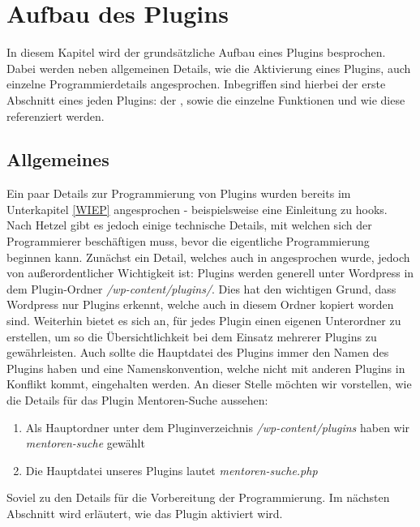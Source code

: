 \section{Aufbau des Plugins}\label{AUFBAUPLUGIN}
In diesem Kapitel wird der grundsätzliche Aufbau eines Plugins besprochen. Dabei werden neben allgemeinen Details, wie die Aktivierung eines Plugins, auch einzelne Programmierdetails angesprochen. Inbegriffen sind hierbei der erste Abschnitt eines jeden Plugins: der , sowie die einzelne Funktionen und wie diese referenziert werden.
\subsection{Allgemeines}
Ein paar Details zur Programmierung von Plugins wurden bereits im Unterkapitel \ref{WIEP} angesprochen - beispielsweise eine Einleitung zu hooks.\newline
Nach Hetzel gibt es jedoch einige technische Details, mit welchen sich der Programmierer beschäftigen muss, bevor die eigentliche Programmierung beginnen kann. Zunächst ein Detail, welches auch in  angesprochen wurde, jedoch von außerordentlicher Wichtigkeit ist: Plugins werden generell unter Wordpress in dem Plugin-Ordner {\emph{/wp-content/plugins/}}. Dies hat den wichtigen Grund, dass Wordpress nur Plugins erkennt, welche auch in diesem Ordner kopiert worden sind. Weiterhin bietet es sich an, für jedes Plugin einen eigenen Unterordner zu erstellen, um so die Übersichtlichkeit bei dem Einsatz mehrerer Plugins zu gewährleisten. Auch sollte die Hauptdatei des Plugins immer den Namen des Plugins haben und eine Namenskonvention, welche nicht mit anderen Plugins in Konflikt kommt, eingehalten werden.\newline
An dieser Stelle möchten wir vorstellen, wie die Details für das Plugin Mentoren-Suche aussehen:
\begin{enumerate}
	\item Als Hauptordner unter dem Pluginverzeichnis {\emph{/wp-content/plugins}} haben wir {\emph{mentoren-suche}} gewählt 
	\item Die Hauptdatei unseres Plugins lautet {\emph{mentoren-suche.php}}
\end{enumerate}
Soviel zu den Details für die Vorbereitung der Programmierung. Im nächsten Abschnitt wird erläutert, wie das Plugin aktiviert wird.
